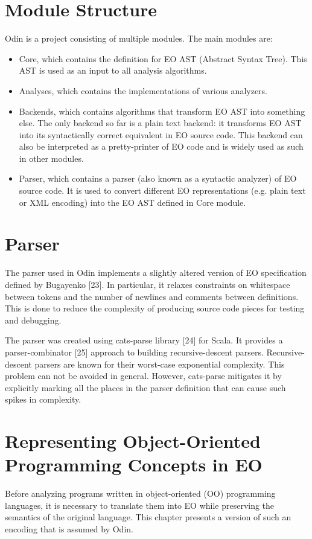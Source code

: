 \section{Module Structure}
Odin is a project consisting of multiple modules. The main modules are:
\begin{itemize}
    \item Core, which contains the definition for EO AST (Abstract Syntax Tree).
          This AST is used as an input to all analysis algorithms.
    \item Analyses, which contains the implementations of various analyzers.
    \item Backends, which contains algorithms that transform EO AST into something else. The only backend so far is a plain text backend: it transforms EO AST into its syntactically correct equivalent in EO source code. This backend can also be interpreted as a pretty-printer of EO code and is widely used as such in other modules.
    \item Parser, which contains a parser (also known as a syntactic analyzer) of EO source code. It is used to convert different EO representations (e.g. plain text or XML encoding) into the EO AST defined in Core module.
\end{itemize}
\section{Parser}
The parser used in Odin implements a slightly altered version of EO specification defined by Bugayenko [23]. In particular, it relaxes constraints on whitespace between tokens and the number of newlines and comments between definitions. This is done to reduce the complexity of producing source code pieces for testing and debugging.

The parser was created using cats-parse library [24] for Scala. It provides a parser-combinator [25] approach to building recursive-descent parsers. Recursive-descent parsers are known for their worst-case exponential complexity. This problem can not be avoided in general. However, cats-parse mitigates it by explicitly marking all the places in the parser definition that can cause such spikes in complexity.

\section{Representing Object-Oriented Programming Concepts in EO}
Before analyzing programs written in object-oriented (OO) programming languages, it is necessary to translate them into EO while preserving the semantics of the original language. This chapter presents a version of such an encoding that is assumed by Odin.

